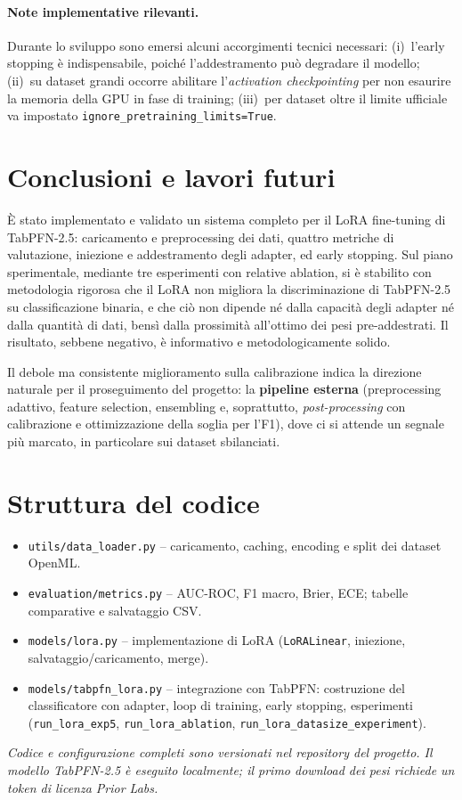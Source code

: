 \documentclass[11pt,a4paper]{article}
\begin{document}
\paragraph{Note implementative rilevanti.} Durante lo sviluppo sono emersi alcuni
accorgimenti tecnici necessari: (i)~l'early stopping è indispensabile, poiché
l'addestramento può degradare il modello; (ii)~su dataset grandi occorre
abilitare l'\emph{activation checkpointing} per non esaurire la memoria della GPU
in fase di training; (iii)~per dataset oltre il limite ufficiale va impostato
\texttt{ignore\_pretraining\_limits=True}.

\section{Conclusioni e lavori futuri}
È stato implementato e validato un sistema completo per il LoRA fine-tuning di
TabPFN-2.5: caricamento e preprocessing dei dati, quattro metriche di
valutazione, iniezione e addestramento degli adapter, ed early stopping. Sul
piano sperimentale, mediante tre esperimenti con relative ablation, si è stabilito
con metodologia rigorosa che il LoRA non migliora la discriminazione di
TabPFN-2.5 su classificazione binaria, e che ciò non dipende né dalla capacità
degli adapter né dalla quantità di dati, bensì dalla prossimità all'ottimo dei
pesi pre-addestrati. Il risultato, sebbene negativo, è informativo e
metodologicamente solido.

Il debole ma consistente miglioramento sulla calibrazione indica la direzione
naturale per il proseguimento del progetto: la \textbf{pipeline esterna}
(preprocessing adattivo, feature selection, ensembling e, soprattutto,
\emph{post-processing} con calibrazione e ottimizzazione della soglia per l'F1),
dove ci si attende un segnale più marcato, in particolare sui dataset
sbilanciati.

\appendix
\section{Struttura del codice}
\begin{itemize}[nosep]
  \item \texttt{utils/data\_loader.py} -- caricamento, caching, encoding e split
  dei dataset OpenML.
  \item \texttt{evaluation/metrics.py} -- AUC-ROC, F1 macro, Brier, ECE; tabelle
  comparative e salvataggio CSV.
  \item \texttt{models/lora.py} -- implementazione di LoRA (\texttt{LoRALinear},
  iniezione, salvataggio/caricamento, merge).
  \item \texttt{models/tabpfn\_lora.py} -- integrazione con TabPFN: costruzione
  del classificatore con adapter, loop di training, early stopping, esperimenti
  (\texttt{run\_lora\_exp5}, \texttt{run\_lora\_ablation},
  \texttt{run\_lora\_datasize\_experiment}).
\end{itemize}

\noindent\textit{Codice e configurazione completi sono versionati nel repository
del progetto. Il modello TabPFN-2.5 è eseguito localmente; il primo download dei
pesi richiede un token di licenza Prior Labs.}
\end{document}
